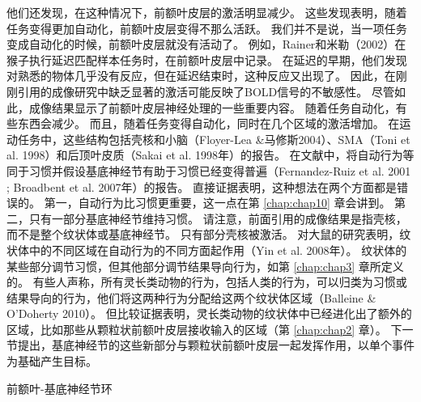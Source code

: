 他们还发现，在这种情况下，前额叶皮层的激活明显减少。
这些发现表明，随着任务变得更加自动化，前额叶皮层变得不那么活跃。
我们并不是说，当一项任务变成自动化的时候，前额叶皮层就没有活动了。
例如，Rainer和米勒（2002）在猴子执行延迟匹配样本任务时，在前额叶皮层中记录。
在延迟的早期，他们发现对熟悉的物体几乎没有反应，但在延迟结束时，这种反应又出现了。
因此，在刚刚引用的成像研究中缺乏显著的激活可能反映了BOLD信号的不敏感性。
尽管如此，成像结果显示了前额叶皮层神经处理的一些重要内容。
随着任务自动化，有些东西会减少。
而且，随着任务变得自动化，同时在几个区域的激活增加。
在运动任务中，这些结构包括壳核和小脑（Floyer-Lea \&马修斯2004）、SMA（Toni et al. 1998）和后顶叶皮质（Sakai et al. 1998年）的报告。
在文献中，将自动行为等同于习惯并假设基底神经节有助于习惯已经变得普遍（Fernandez-Ruiz et al. 2001 ; Broadbent et al. 2007年）的报告。
直接证据表明，这种想法在两个方面都是错误的。
第一，自动行为比习惯更重要，这一点在第 \ref{chap:chap10} 章会讲到。
第二，只有一部分基底神经节维持习惯。
请注意，前面引用的成像结果是指壳核，而不是整个纹状体或基底神经节。
只有部分壳核被激活。
对大鼠的研究表明，纹状体中的不同区域在自动行为的不同方面起作用（Yin et al. 2008年）。
纹状体的某些部分调节习惯，但其他部分调节结果导向行为，如第 \ref{chap:chap3} 章所定义的。
有些人声称，所有灵长类动物的行为，包括人类的行为，可以归类为习惯或结果导向的行为，他们将这两种行为分配给这两个纹状体区域（Balleine \& O'Doherty 2010）。
但比较证据表明，灵长类动物的纹状体中已经进化出了额外的区域，比如那些从颗粒状前额叶皮层接收输入的区域（第 \ref{chap:chap2} 章）。
下一节提出，基底神经节的这些新部分与颗粒状前额叶皮层一起发挥作用，以单个事件为基础产生目标。



前额叶-基底神经节环

